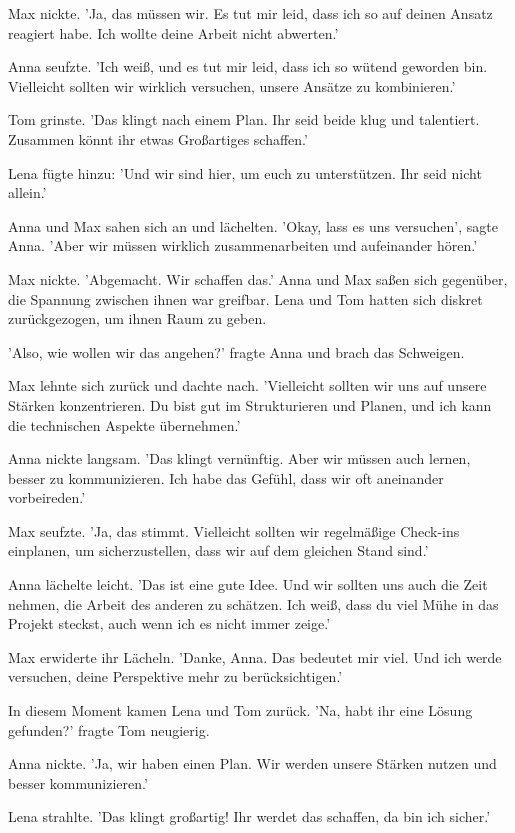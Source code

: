 \documentclass[12pt]{article}
\begin{document}
Max nickte. 'Ja, das müssen wir. Es tut mir leid, dass ich so auf deinen Ansatz reagiert habe. Ich wollte deine Arbeit nicht abwerten.'

Anna seufzte. 'Ich weiß, und es tut mir leid, dass ich so wütend geworden bin. Vielleicht sollten wir wirklich versuchen, unsere Ansätze zu kombinieren.'

Tom grinste. 'Das klingt nach einem Plan. Ihr seid beide klug und talentiert. Zusammen könnt ihr etwas Großartiges schaffen.'

Lena fügte hinzu: 'Und wir sind hier, um euch zu unterstützen. Ihr seid nicht allein.'

Anna und Max sahen sich an und lächelten. 'Okay, lass es uns versuchen', sagte Anna. 'Aber wir müssen wirklich zusammenarbeiten und aufeinander hören.'

Max nickte. 'Abgemacht. Wir schaffen das.' Anna und Max saßen sich gegenüber, die Spannung zwischen ihnen war greifbar. Lena und Tom hatten sich diskret zurückgezogen, um ihnen Raum zu geben.

'Also, wie wollen wir das angehen?' fragte Anna und brach das Schweigen.

Max lehnte sich zurück und dachte nach. 'Vielleicht sollten wir uns auf unsere Stärken konzentrieren. Du bist gut im Strukturieren und Planen, und ich kann die technischen Aspekte übernehmen.'

Anna nickte langsam. 'Das klingt vernünftig. Aber wir müssen auch lernen, besser zu kommunizieren. Ich habe das Gefühl, dass wir oft aneinander vorbeireden.'

Max seufzte. 'Ja, das stimmt. Vielleicht sollten wir regelmäßige Check-ins einplanen, um sicherzustellen, dass wir auf dem gleichen Stand sind.'

Anna lächelte leicht. 'Das ist eine gute Idee. Und wir sollten uns auch die Zeit nehmen, die Arbeit des anderen zu schätzen. Ich weiß, dass du viel Mühe in das Projekt steckst, auch wenn ich es nicht immer zeige.'

Max erwiderte ihr Lächeln. 'Danke, Anna. Das bedeutet mir viel. Und ich werde versuchen, deine Perspektive mehr zu berücksichtigen.'

In diesem Moment kamen Lena und Tom zurück. 'Na, habt ihr eine Lösung gefunden?' fragte Tom neugierig.

Anna nickte. 'Ja, wir haben einen Plan. Wir werden unsere Stärken nutzen und besser kommunizieren.'

Lena strahlte. 'Das klingt großartig! Ihr werdet das schaffen, da bin ich sicher.'
\end{document}
